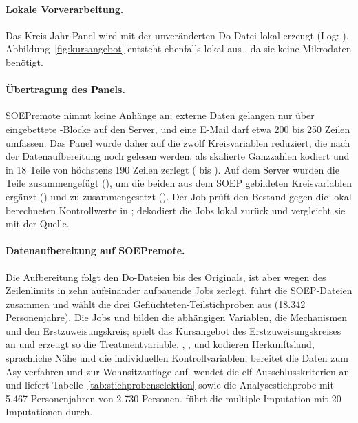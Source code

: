 \paragraph{Lokale Vorverarbeitung.} Das Kreis-Jahr-Panel wird mit der unveränderten Do-Datei  lokal erzeugt (Log: ). Abbildung~\ref{fig:kursangebot} entsteht ebenfalls lokal aus , da sie keine Mikrodaten benötigt.

\paragraph{Übertragung des Panels.} SOEPremote nimmt keine Anhänge an; externe Daten gelangen nur über eingebettete -Blöcke auf den Server, und eine E-Mail darf etwa 200 bis 250 Zeilen umfassen. Das Panel wurde daher auf die zwölf Kreisvariablen reduziert, die nach der Datenaufbereitung noch gelesen werden, als skalierte Ganzzahlen kodiert und in 18 Teile von höchstens 190 Zeilen zerlegt ( bis ). Auf dem Server wurden die Teile zusammengefügt (), um die beiden aus dem SOEP gebildeten Kreisvariablen ergänzt () und zu  zusammengesetzt (). Der Job  prüft den Bestand gegen die lokal berechneten Kontrollwerte in ;  dekodiert die Jobs lokal zurück und vergleicht sie mit der Quelle.

\begin{sloppypar}
\paragraph{Datenaufbereitung auf SOEPremote.} Die Aufbereitung folgt den Do-Dateien  bis  des Originals, ist aber wegen des Zeilenlimits in zehn aufeinander aufbauende Jobs zerlegt.  führt die SOEP-Dateien zusammen und wählt die drei Geflüchteten-Teilstichproben aus (18.342 Personenjahre). Die Jobs  und  bilden die abhängigen Variablen, die Mechanismen und den Erstzuweisungskreis;  spielt das Kursangebot des Erstzuweisungskreises an und erzeugt so die Treatmentvariable. , ,  und  kodieren Herkunftsland, sprachliche Nähe und die individuellen Kontrollvariablen;  bereitet die Daten zum Asylverfahren und zur Wohnsitzauflage auf.  wendet die elf Ausschlusskriterien an und liefert Tabelle~\ref{tab:stichprobenselektion} sowie die Analysestichprobe mit 5.467 Personenjahren von 2.730 Personen.  führt die multiple Imputation mit 20 Imputationen durch.
\end{sloppypar}

